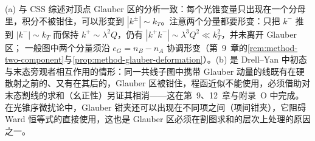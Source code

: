 (a) 与 CSS 综述对顶点 Glauber 区的分析一致：每个光锥变量只出现在一个分母里，积分不被钳住，可以形变到 $|k^\pm|\sim k_T$\cite[第~8.4~节，式~(137)--(138)]{CollinsSoperSterman1989}。注意两个分量都要形变：只把 $k^-$ 推到 $|k^-|\sim k_T$ 而保持 $k^+\sim\lambda^2Q$，仍有 $|k^+k^-|\sim\lambda^3Q^2\ll k_T^2$，并未离开 Glauber 区；%
一般图中两个分量须沿 $e_G=n_B-n_A$ 协调形变（第~9~章的\cref{rem:method-two-component}与\cref{prop:method-glauber-deformation}）。(b) 是 Drell--Yan 中初态与末态旁观者相互作用的情形：同一共线子图中携带 Glauber 动量的线既有在硬散射之前的、又有在其后的，Glauber 区被钳住，程函近似不能使用，必须借助对末态割线的求和（幺正性）另证其相消——这在第~9、12~章与附录~O 中完成。在光锥序微扰论中，Glauber 钳夹还可以出现在不同项之间（项间钳夹），它阻碍 Ward 恒等式的直接使用，这也是 Glauber 区必须在割图求和的层次上处理的原因之一。
